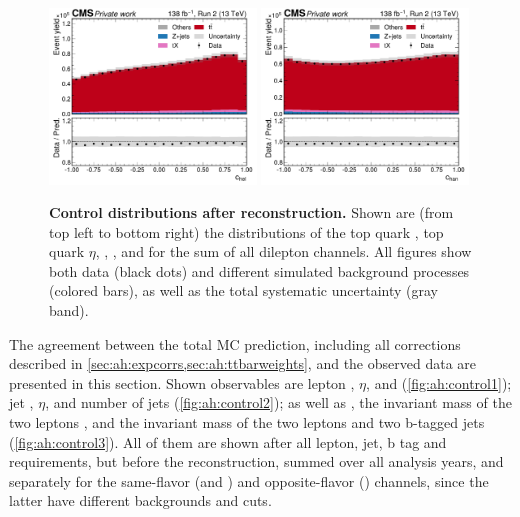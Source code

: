 \begin{figure}[!hp]
    \includegraphics[width=0.49\textwidth]{figures/ah/controlplots/Reco/ll/chel_Reco_ll.pdf}
    \hfill
    \includegraphics[width=0.49\textwidth]{figures/ah/controlplots/Reco/ll/chan_Reco_ll.pdf}
    \caption{
        \textbf{Control distributions after \ttbar reconstruction.} Shown are (from top left to bottom right) the distributions of the top quark \pt, top quark $\eta$, \mtt, \cost, \chel and \chan for the sum of all dilepton channels. All figures show both data (black dots) and different simulated background processes (colored bars), as well as the total systematic uncertainty (gray band). 
    }
    \label{fig:ah:controlttbar}
\end{figure}

The agreement between the total MC prediction, including all corrections described in \cref{sec:ah:expcorrs,sec:ah:ttbarweights}, and the observed data are presented in this section. Shown observables are lepton \pt, $\eta$, and \dphill (\cref{fig:ah:control1}); jet \pt, $\eta$, and number of jets (\cref{fig:ah:control2}); as well as \ptmiss, the invariant mass of the two leptons \mll, and the invariant mass of the two leptons and two b-tagged jets \mbbll (\cref{fig:ah:control3}). All of them are shown after all lepton, jet, b tag and \ptmiss requirements, but before the \ttbar reconstruction, summed over all analysis years, and separately for the same-flavor (\ee and \mumu) and opposite-flavor (\emu) channels, since the latter have different backgrounds and cuts.

